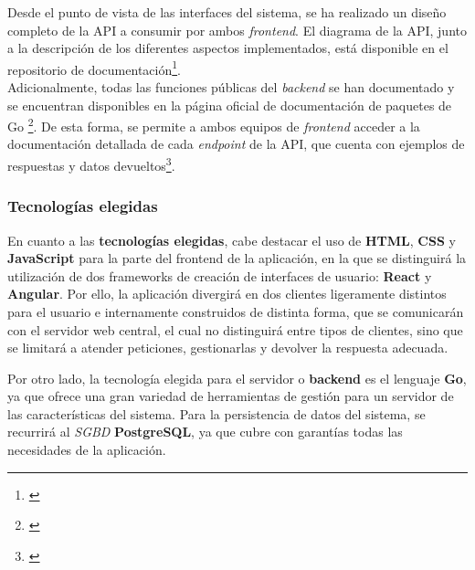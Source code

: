 \documentclass[11pt, a4paper, titlepage]{article}
\begin{document}
Desde el punto de vista de las interfaces del sistema, se ha realizado un diseño completo de la API a consumir por ambos \textit{frontend}. El diagrama de la API, junto a la descripción de los diferentes aspectos implementados, está disponible en el repositorio de documentación\footnote{\href{https://github.com/UNIZAR-30226-2022-01/proyecto_software_documentacion/documentacion_API.md}{\color{blue}{Documentación de la API.}}}. \\

Adicionalmente, todas las funciones públicas del \textit{backend} se han documentado y se encuentran disponibles en la página oficial de documentación de paquetes de Go \footnote{\href{https://pkg.go.dev/github.com/UNIZAR-30226-2022-01/proyecto_software_backend}{}}. De esta forma, se permite a ambos equipos de \textit{frontend} acceder a la documentación detallada de cada \textit{endpoint} de la API, que cuenta con ejemplos de respuestas y datos devueltos\footnote{\href{https://pkg.go.dev/github.com/UNIZAR-30226-2022-01/proyecto_software_backend/handlers}{}}.

\subsubsection{Tecnologías elegidas}

En cuanto a las \textbf{tecnologías elegidas}, cabe destacar el uso de \textbf{HTML}, \textbf{CSS} y \textbf{JavaScript} para la parte del frontend de la aplicación, en la que se distinguirá la utilización de dos frameworks de creación de interfaces de usuario: \textbf{React} y \textbf{Angular}. Por ello, la aplicación divergirá en dos clientes ligeramente distintos para el usuario e internamente construidos de distinta forma, que se comunicarán con el servidor web central, el cual no distinguirá entre tipos de clientes, sino que se limitará a atender peticiones, gestionarlas y devolver la respuesta adecuada. \newline

Por otro lado, la tecnología elegida para el servidor o \textbf{backend} es el lenguaje \textbf{Go}, ya que ofrece una gran variedad de herramientas de gestión para un servidor de las características del sistema. Para la persistencia de datos del sistema, se recurrirá al \textit{SGBD} \textbf{PostgreSQL}, ya que cubre con garantías todas las necesidades de la aplicación. \newline
\end{document}
